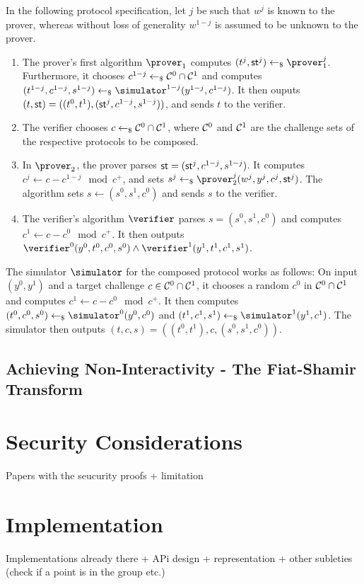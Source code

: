 \documentclass[runningheads]{llncs}
\begin{document}
  In the following protocol specification, let $j$ be such that $w^j$ is known to the prover, whereas without loss of generality $w^{1-j}$ is assumed to be unknown to the prover.
  \begin{enumerate}
    \item
      The prover's first algorithm $\prover_1$ computes $(t^j,\st^j)\getsr\prover_1^j$.
      Furthermore, it chooses $c^{1-j}\gets_{\$}\mathcal{C}^0\cap\mathcal{C}^1$ and computes $(t^{1-j},c^{1-j},s^{1-j})\getsr\simulator^{1-j}(y^{1-j},c^{1-j})$.
      It then ouputs $(t,\mathsf{st}) = ((t^0,t^1),(\mathsf{st}^j,c^{1-j},s^{1-j}))$, and sends $t$ to the verifier.
    \item
      The verifier chooses $c\gets_{\$}\mathcal{C}^0\cap\mathcal{C}^1$, where $\mathcal{C}^0$ and $\mathcal{C}^1$ are the challenge sets of the respective protocols to be composed.
    \item
      In $\prover_2$, the prover parses $\mathsf{st}=(\mathsf{st}^j,c^{1-j},s^{1-j})$.
      It computes $c^j\gets c-c^{1-j}\mod c^+$, and sets $s^j\getsr\prover_2^j(w^j,y^j,c^j,\st^j)$.
      The algorithm sets $s\gets(s^0,s^1,c^0)$ and sends $s$ to the verifier.
    \item
      The verifier's algorithm $\verifier$ parses $s=(s^0,s^1,c^0)$ and computes $c^1\gets c-c^0\mod c^+$.
      It then outputs $\verifier^0(y^0,t^0,c^0,s^0)\land\verifier^1(y^1,t^1,c^1,s^1)$. 
  \end{enumerate}

  The simulator $\simulator$ for the composed protocol works as follows:
  On input $(y^0,y^1)$ and a target challenge $c\in\mathcal{C}^0\cap\mathcal{C}^1$, it chooses a random $c^0$ in $\mathcal{C}^0\cap\mathcal{C}^1$ and computes $c^1\gets c-c^0 \mod c^+$.
  It then computes $(t^0,c^0,s^0)\getsr\simulator^0(y^0,c^0)$ and $(t^1,c^1,s^1)\getsr\simulator^1(y^1,c^1)$.
  The simulator then outputs $(t,c,s)=((t^0,t^1),c,(s^0,s^1,c^0))$.

\subsection{Achieving Non-Interactivity - The Fiat-Shamir Transform}


\section{Security Considerations}

Papers with the seucurity proofs + limitation

\section{Implementation}
Implementations already there + APi design + representation + other subleties (check if a point is in the group etc.)
\end{document}
